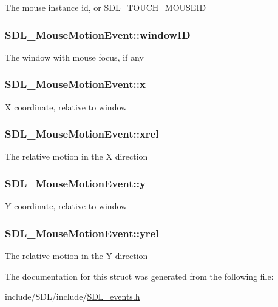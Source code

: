 The mouse instance id, or S\-D\-L\-\_\-\-T\-O\-U\-C\-H\-\_\-\-M\-O\-U\-S\-E\-I\-D \hypertarget{struct_s_d_l___mouse_motion_event_aa9976725242ada93a9e18e7fdf5796e6}{
\subsubsection[{window\-I\-D}]{ S\-D\-L\-\_\-\-Mouse\-Motion\-Event\-::window\-I\-D}}\label{struct_s_d_l___mouse_motion_event_aa9976725242ada93a9e18e7fdf5796e6}
The window with mouse focus, if any \hypertarget{struct_s_d_l___mouse_motion_event_a36398bb4a5308446a262b0bfc8baa80a}{
\subsubsection[{x}]{ S\-D\-L\-\_\-\-Mouse\-Motion\-Event\-::x}}\label{struct_s_d_l___mouse_motion_event_a36398bb4a5308446a262b0bfc8baa80a}
X coordinate, relative to window \hypertarget{struct_s_d_l___mouse_motion_event_a1c01d9aba2a20778fb45a15dca39ef58}{
\subsubsection[{xrel}]{ S\-D\-L\-\_\-\-Mouse\-Motion\-Event\-::xrel}}\label{struct_s_d_l___mouse_motion_event_a1c01d9aba2a20778fb45a15dca39ef58}
The relative motion in the X direction \hypertarget{struct_s_d_l___mouse_motion_event_a7e6a7b1f8713d1968dc913908e8ea448}{
\subsubsection[{y}]{ S\-D\-L\-\_\-\-Mouse\-Motion\-Event\-::y}}\label{struct_s_d_l___mouse_motion_event_a7e6a7b1f8713d1968dc913908e8ea448}
Y coordinate, relative to window \hypertarget{struct_s_d_l___mouse_motion_event_a7674c8b92d039ab948f671a180fa7b30}{
\subsubsection[{yrel}]{ S\-D\-L\-\_\-\-Mouse\-Motion\-Event\-::yrel}}\label{struct_s_d_l___mouse_motion_event_a7674c8b92d039ab948f671a180fa7b30}
The relative motion in the Y direction 

The documentation for this struct was generated from the following file\-:\begin{DoxyCompactItemize}
\item 
include/\-S\-D\-L/include/\hyperlink{_s_d_l__events_8h}{S\-D\-L\-\_\-events.\-h}\end{DoxyCompactItemize}

